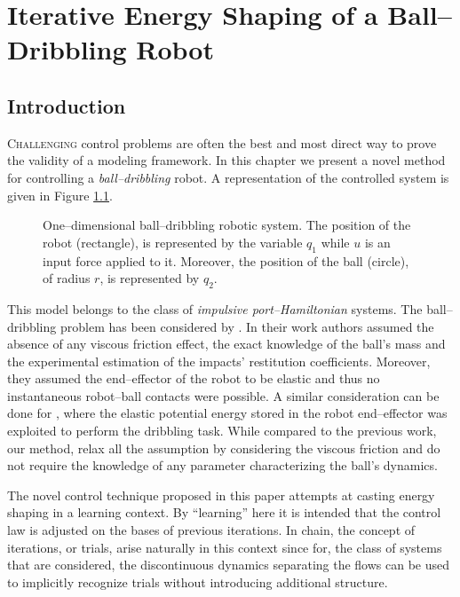 %
\chapter{Iterative Energy Shaping of a Ball--Dribbling Robot}

\label{chap:balldribbling}
\minitoc

\thispagestyle{empty}

\newpage
\section{Introduction}
%
\lettrine[lines=4]{\color{brickred}C}{hallenging} control problems are often the best and most direct way to prove the validity of a modeling framework. In this chapter we present a novel method for controlling a \textit{ball--dribbling} robot.
A representation of the controlled system is given in Figure \ref{fig:bdcatchy}.
%
\begin{figure}[!ht]
	\centering
	
	\caption{One--dimensional ball--dribbling robotic system. The position of the robot (rectangle), is represented by the variable $q_1$ while $u$ is an input force applied to it. Moreover, the position of the ball (circle), of radius $r$, is represented by $q_2$. }
	\label{fig:bdcatchy}
\end{figure}
%

This model belongs to the class of \textit{impulsive port--Hamiltonian} systems. The ball--dribbling problem has been considered by \cite{Batz2010}. In their work authors assumed the absence of any viscous friction effect, the exact knowledge of the ball's mass and the experimental estimation of the impacts' restitution coefficients. Moreover, they assumed the end--effector of the robot to be elastic and thus no instantaneous robot--ball contacts were possible. A similar consideration can be done for \citep{haddadin2018exploiting}, where the elastic potential energy stored in the robot end--effector was exploited to perform the dribbling task. While compared to the previous work, our method, relax all the assumption by considering the viscous friction and do not require the knowledge of any parameter characterizing the ball's dynamics.

The novel control technique proposed in this paper attempts at casting energy shaping in a learning context. By ``learning'' here it is intended that the control law is adjusted on the bases of previous iterations. In chain, the concept of iterations, or trials, arise naturally in this context since for, the class of systems that are considered, the discontinuous dynamics separating the flows can be used to implicitly recognize trials without introducing additional structure.

